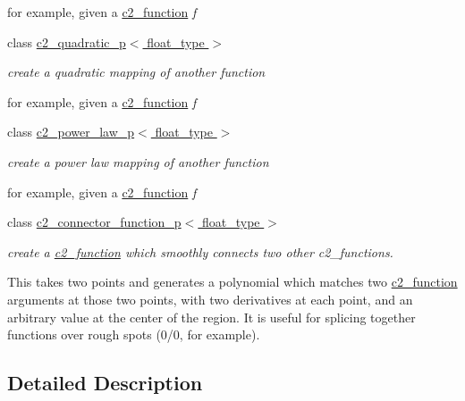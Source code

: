 \begin{DoxyCompactItemize}
\begin{DoxyCompactList}
for example, given a \hyperlink{classc2__function}{c2\-\_\-function} {\itshape f} \end{DoxyCompactList}\item 
class \hyperlink{classc2__quadratic__p}{c2\-\_\-quadratic\-\_\-p$<$ float\-\_\-type $>$}
\begin{DoxyCompactList}\small\item\em create a quadratic mapping of another function

for example, given a \hyperlink{classc2__function}{c2\-\_\-function} {\itshape f} \end{DoxyCompactList}\item 
class \hyperlink{classc2__power__law__p}{c2\-\_\-power\-\_\-law\-\_\-p$<$ float\-\_\-type $>$}
\begin{DoxyCompactList}\small\item\em create a power law mapping of another function

for example, given a \hyperlink{classc2__function}{c2\-\_\-function} {\itshape f} \end{DoxyCompactList}\item 
class \hyperlink{classc2__connector__function__p}{c2\-\_\-connector\-\_\-function\-\_\-p$<$ float\-\_\-type $>$}
\begin{DoxyCompactList}\small\item\em create a \hyperlink{classc2__function}{c2\-\_\-function} which smoothly connects two other c2\-\_\-functions.

This takes two points and generates a polynomial which matches two \hyperlink{classc2__function}{c2\-\_\-function} arguments at those two points, with two derivatives at each point, and an arbitrary value at the center of the region. It is useful for splicing together functions over rough spots (0/0, for example). \end{DoxyCompactList}\end{DoxyCompactItemize}


\subsection{Detailed Description}
